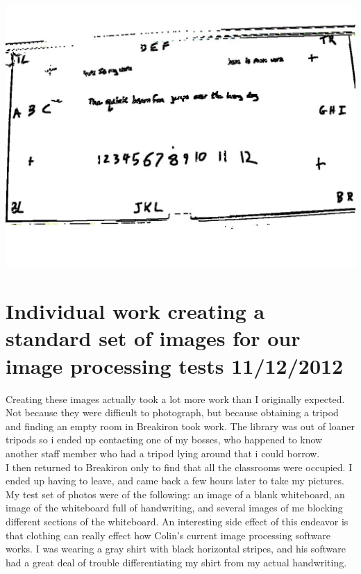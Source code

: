 \documentclass[]{article}
\begin{document}
		\includegraphics[scale=0.2]{images/cannydemo3.jpg} \\

	\section{Individual work creating a standard set of images for our image processing tests 11/12/2012}

	Creating these images actually took a lot more work than I originally expected. Not because they were difficult to photograph, but because obtaining a tripod and finding an empty room in Breakiron took work. The library was out of loaner tripods so i ended up contacting one of my bosses, who happened to know another staff member who had a tripod lying around that i could borrow.\\
	I then returned to Breakiron only to find that all the classrooms were occupied. I ended up having to leave, and came back a few hours later to take my pictures.\\
	
	My test set of photos were of the following: an image of a blank whiteboard,  an image of the whiteboard full of handwriting, and several images of me blocking different sections of the whiteboard. An interesting side effect of this endeavor is that clothing can really effect how Colin's current image processing software works. I was wearing a gray shirt with black horizontal stripes, and his software had a great deal of trouble differentiating my shirt from my actual handwriting.\\
	
\end{document}
